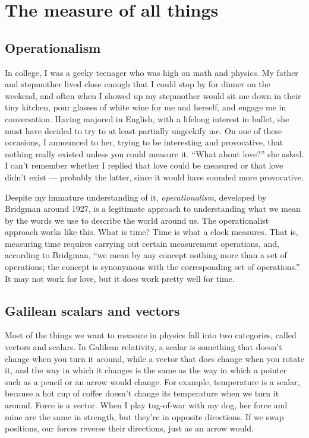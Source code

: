 \chapter{The measure of all things}

\section{Operationalism}

In college, I was a geeky teenager who was high on math and physics.
My father and stepmother lived close enough that I could stop by
for dinner on the weekend, and often when I showed up my stepmother
would sit me down in their tiny kitchen, pour  glasses of white wine
for me and herself, and engage me in conversation. Having majored in English,
with a lifelong interest in ballet, she must have
decided to try to at least partially ungeekify me. On one of these occasions,
I announced to her, trying to be interesting and provocative, that
nothing really existed unless you could measure it.
``What about love?'' she asked. I can't remember whether I replied that
love could be measured or that love didn't exist --- probably the latter,
since it would have sounded more provocative.

Despite my immature understanding of it, \emph{operationalism}, developed by Bridgman
around 1927, is a legitimate
approach to understanding what we mean by the words we use to describe the
world around us. The operationalist approach works like this. What is time?
Time is what a clock measures. That is, measuring time requires carrying out
certain measurement operations, and, according to Bridgman,
``we mean by any concept nothing more than a set of operations;
the concept is synonymous with the corresponding set of operations.''
It may not work for love, but it does work pretty well for time.

\section{Galilean scalars and vectors}

Most of the things we want to measure in physics fall into two categories,
called vectors and scalars. In Galilean relativity, a scalar is something
that doesn't change when you turn it around, while a vector that does change
when you rotate it, and the way in which it changes is the same as the way
in which a pointer such as a pencil or an arrow would change. For example,
temperature is a scalar, because a hot cup of coffee doesn't change its temperature
when we turn it around. Force is a vector. When I play tug-of-war with my dog,
her force and mine are the same in strength, but they're in opposite directions.
If we swap positions, our forces reverse their directions, just as an arrow would.

